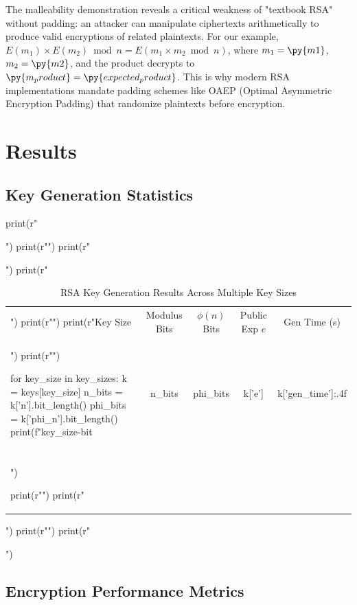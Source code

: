 \documentclass[a4paper, 11pt]{article}
\begin{document}
The malleability demonstration reveals a critical weakness of "textbook RSA" without padding:
an attacker can manipulate ciphertexts arithmetically to produce valid encryptions of related
plaintexts. For our example, $E(m_1) \times E(m_2) \bmod n = E(m_1 \times m_2 \bmod n)$, where
$m_1 = \py{m1}$, $m_2 = \py{m2}$, and the product decrypts to $\py{m_product} = \py{expected_product}$.
This is why modern RSA implementations mandate padding schemes like OAEP (Optimal Asymmetric
Encryption Padding) that randomize plaintexts before encryption.

\section{Results}

\subsection{Key Generation Statistics}

\begin{pycode}
print(r"\begin{table}[htbp]")
print(r"\centering")
print(r"\caption{RSA Key Generation Results Across Multiple Key Sizes}")
print(r"\begin{tabular}{lcccc}")
print(r"\toprule")
print(r"Key Size & Modulus Bits & $\phi(n)$ Bits & Public Exp $e$ & Gen Time (s) \\")
print(r"\midrule")

for key_size in key_sizes:
    k = keys[key_size]
    n_bits = k['n'].bit_length()
    phi_bits = k['phi_n'].bit_length()
    print(f"{key_size}-bit & {n_bits} & {phi_bits} & {k['e']} & {k['gen_time']:.4f} \\\\")

print(r"\bottomrule")
print(r"\end{tabular}")
print(r"\label{tab:keygen}")
print(r"\end{table}")
\end{pycode}

\subsection{Encryption Performance Metrics}
\end{document}
